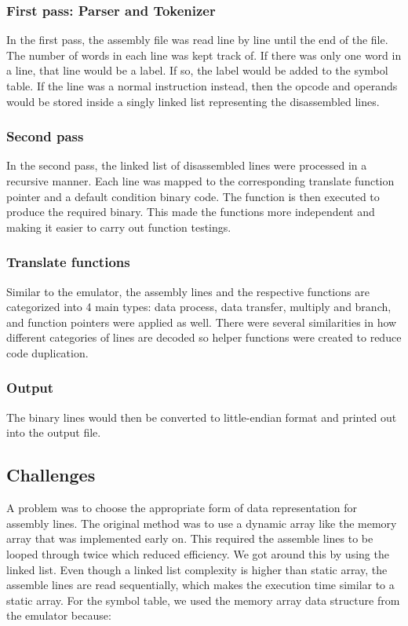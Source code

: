 \documentclass[10pt]{article}
\begin{document}
\subsubsection{First pass: Parser and Tokenizer}
In the first pass, the assembly file was read line by line until the end of the file. The number of words in each line was kept track of. If there was only one word in a line, that line would be a label. If so, the label would be added to the symbol table. If the line was a normal instruction instead, then the opcode and operands would be stored inside a singly linked list representing the disassembled lines.
\subsubsection{Second pass}
In the second pass, the linked list of disassembled lines were processed in a recursive manner. Each line was mapped to the corresponding translate function pointer and a default condition binary code. The function is then executed to produce the required binary. This made the functions more independent and making it easier to carry out function testings.
    
\subsubsection{Translate functions}
Similar to the emulator, the assembly lines and the respective functions are categorized into 4 main types: data process, data transfer, multiply and branch, and function pointers were applied as well.  There were several similarities in how different categories of lines are decoded so helper functions were created to reduce code duplication.

\subsubsection{Output}
The binary lines would then be converted to little-endian format and printed out into the output file.

\subsection{Challenges}
A problem was to choose the appropriate form of data representation for assembly lines. The original method was to use a dynamic array like the memory array that was implemented early on. This required the assemble lines to be looped through twice which reduced efficiency. We got around this by using the linked list. Even though a linked list complexity is higher than static array, the assemble lines are read sequentially, which makes the execution time similar to a static array.\newline
For the symbol table, we used the memory array data structure from the emulator because:
    
\end{document}
